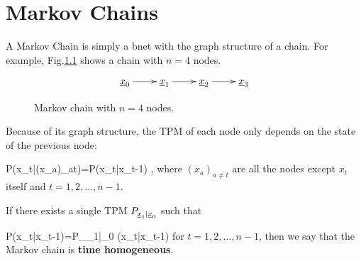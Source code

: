 \chapter{Markov Chains}

A Markov Chain is simply
a bnet with the graph structure 
of a chain. For example,
Fig.\ref{fig-mchain}
shows a chain with $n=4$ nodes.

\begin{figure}[h!]
\centering
$$\xymatrix{
\rvx_0\ar[r]
&\rvx_1\ar[r]
&\rvx_2\ar[r]
&\rvx_3
}$$
\caption{Markov chain with $n=4$ nodes.}
\label{fig-mchain}
\end{figure}

Because of its
 graph structure,
the TPM of each node
only depends on the state of the previous 
node:

\beq
P(x_t|(x_a)_{a\neq t})=P(x_t|x_{t-1})
\;,
\eeq
where $(x_a)_{a\neq t}$ are all
 the nodes except $x_t$ itself and
$t=1, 2, \dots, n-1$.

If there
exists a single
TPM $P_{{\underline{x}}_1|{\underline{x}}_0}$
such that

\beq
P(x_t|x_{t-1})=P_{\rvx_1|\rvx_0}
(x_t|x_{t-1})
\;
\eeq
for $t=1, 2,\dots, n-1$, 
then
we say 
that the Markov chain
is {\bf time homogeneous}.